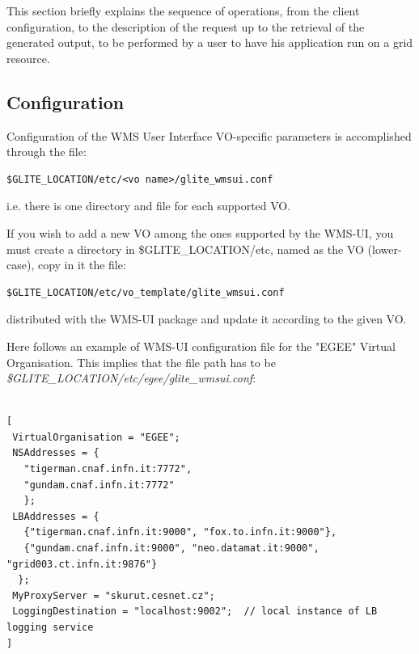
This section briefly explains the sequence of operations, from the client configuration, to the description of the 
request up to the retrieval of the generated output, to be performed by a user to have his application run on a 
grid resource.
 

\subsection{Configuration}

Configuration of the WMS User Interface VO-specific parameters is accomplished through the file:

\smallskip
\begin{verbatim}
$GLITE_LOCATION/etc/<vo name>/glite_wmsui.conf 
\end{verbatim}
\smallskip

i.e. there is one directory and file for each supported VO.

If you wish to add a new VO among the ones supported by the WMS-UI, you must create a directory in \$GLITE\_LOCATION/etc, 
named as the VO (lower-case), copy in it the file: 

\smallskip
\begin{verbatim}
$GLITE_LOCATION/etc/vo_template/glite_wmsui.conf 
\end{verbatim}
\smallskip

distributed with the WMS-UI package and update it according to the given VO.

Here follows an example of WMS-UI configuration file for the "EGEE" Virtual Organisation. 
This implies that the file path has to be \emph{\$GLITE\_LOCATION/etc/egee/glite\_wmsui.conf}: 

\smallskip
\begin{verbatim}

[
 VirtualOrganisation = "EGEE";
 NSAddresses = {
   "tigerman.cnaf.infn.it:7772",
   "gundam.cnaf.infn.it:7772"
   };
 LBAddresses = {
   {"tigerman.cnaf.infn.it:9000", "fox.to.infn.it:9000"},
   {"gundam.cnaf.infn.it:9000", "neo.datamat.it:9000", "grid003.ct.infn.it:9876"}
  };
 MyProxyServer = "skurut.cesnet.cz";
 LoggingDestination = "localhost:9002";  // local instance of LB logging service
]

\end{verbatim}
\smallskip

